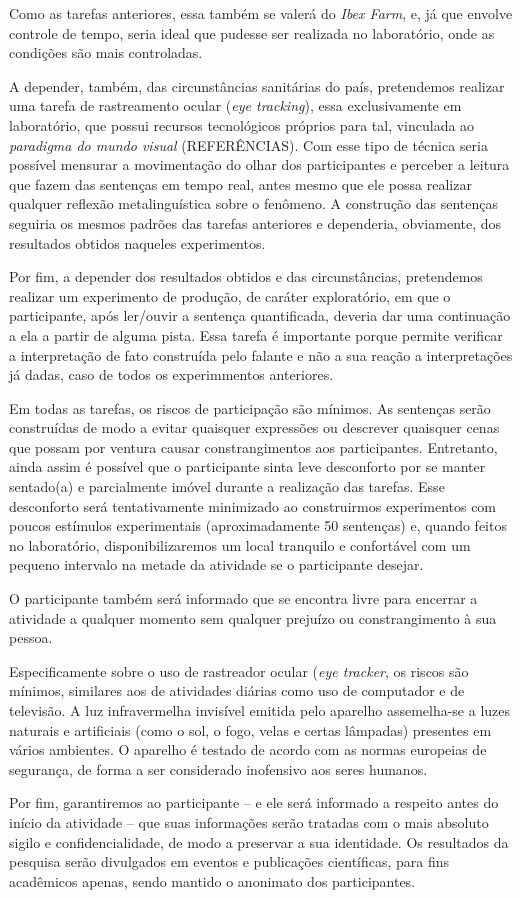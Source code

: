 Como as tarefas anteriores, essa também se valerá do \emph{Ibex Farm}, e, já que envolve controle de tempo, seria ideal que pudesse ser realizada no laboratório, onde as condições são mais controladas.

A depender, também, das circunstâncias sanitárias do país, pretendemos realizar uma tarefa de rastreamento ocular (\emph{eye tracking}), essa exclusivamente em laboratório, que possui recursos tecnológicos próprios para tal, vinculada ao \emph{paradigma do mundo visual} (REFERÊNCIAS). Com esse tipo de técnica seria possível mensurar a movimentação do olhar dos participantes e perceber a leitura que fazem das sentenças em tempo real, antes mesmo que ele possa realizar qualquer reflexão metalinguística sobre o fenômeno. A construção das sentenças seguiria os mesmos padrões das tarefas anteriores e dependeria, obviamente, dos resultados obtidos naqueles experimentos.

Por fim, a depender dos resultados obtidos e das circunstâncias, pretendemos realizar um experimento de produção, de caráter exploratório, em que o participante, após ler/ouvir a sentença quantificada, deveria dar uma continuação a ela a partir de alguma pista. Essa tarefa é importante porque permite verificar a interpretação de fato construída pelo falante e não a sua reação a interpretações já dadas, caso de todos os experimmentos anteriores.

Em todas as tarefas, os riscos de participação são mínimos. As sentenças serão construídas de modo a evitar quaisquer expressões ou descrever quaisquer cenas que possam por ventura causar constrangimentos aos participantes. Entretanto, ainda assim é possível que o participante sinta leve desconforto por se manter sentado(a) e parcialmente imóvel durante a realização das tarefas. Esse desconforto será tentativamente minimizado ao construirmos experimentos com poucos estímulos experimentais (aproximadamente 50 sentenças) e, quando feitos no laboratório, disponibilizaremos um local tranquilo e confortável com um pequeno intervalo na metade da atividade se o participante desejar.

O participante também será informado que se encontra livre para encerrar a atividade a qualquer momento sem qualquer prejuízo ou constrangimento à sua pessoa.

Especificamente sobre o uso de rastreador ocular (\emph{eye tracker}, os riscos são mínimos, similares aos de atividades diárias como uso de computador e de televisão. A luz infravermelha invisível emitida pelo aparelho assemelha-se a luzes naturais e artificiais (como o sol, o fogo, velas e certas lâmpadas) presentes em vários ambientes. O aparelho é testado de acordo com as normas europeias de segurança, de forma a ser considerado inofensivo aos seres humanos.

Por fim, garantiremos ao participante -- e ele será informado a respeito antes do início da atividade -- que suas informações serão tratadas com o mais absoluto sigilo e confidencialidade, de modo a preservar a sua identidade. Os resultados da pesquisa serão divulgados em eventos e publicações científicas, para fins acadêmicos apenas, sendo mantido o anonimato dos participantes.
